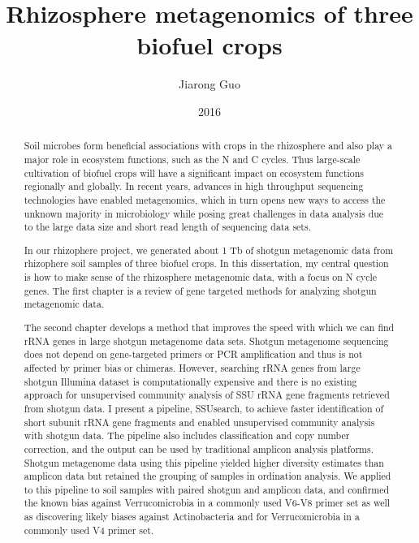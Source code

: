 \documentclass[]{msu-thesis}
\title{Rhizosphere metagenomics of three biofuel crops}
\author{Jiarong Guo}
\date{2016}
\begin{document}
\frontmatter
\maketitlepage
\begin{abstract}
  
Soil microbes form beneficial associations with crops in the rhizosphere
and also play a major role in ecosystem functions, such as the N and C
cycles. Thus large-scale cultivation of biofuel crops will have a
significant impact on ecosystem functions regionally and globally.  In
recent years, advances in high throughput sequencing technologies have
enabled metagenomics, which in turn opens new ways to access the unknown
majority in microbiology while posing great challenges in data analysis
due to the large data size and short read length of sequencing data sets.

In our rhizophere project, we generated about 1 Tb of shotgun metagenomic
data from rhizophere soil samples of three biofuel crops.  In this
dissertation, my central question is how to make sense of the rhizosphere metagenomic data, with a focus on N cycle genes.
The first chapter is a
review of gene targeted methods for analyzing shotgun metagenomic data.

The second chapter develops a method that improves the speed with which
we can find rRNA genes in large shotgun metagenome data sets.
Shotgun
metagenome sequencing does not depend on gene-targeted primers or PCR
amplification and thus is not affected by primer bias or
chimeras. However, searching rRNA genes from large shotgun Illumina
dataset is computationally expensive and there is no existing approach
for unsupervised community analysis of SSU rRNA gene fragments
retrieved from shotgun data. I present a pipeline, SSUsearch, to
achieve faster identification of short subunit rRNA gene fragments and
enabled unsupervised community analysis with shotgun data. The pipeline also
includes classification and copy number correction, and the output can
be used by traditional amplicon analysis platforms. Shotgun metagenome
data using this pipeline yielded higher diversity estimates than
amplicon data but retained the grouping of samples in ordination
analysis. We applied to this pipeline to soil samples with paired
shotgun and amplicon data, and confirmed the known bias against Verrucomicrobia
in a commonly used V6-V8 primer set as well as discovering likely biases
against Actinobacteria and for Verrucomicrobia in a commonly used V4
primer set.


\end{abstract}
\end{document}

